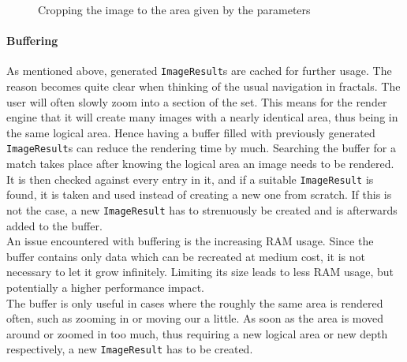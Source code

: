 \documentclass[10pt,a4paper,titlepage]{article}
\begin{document}
	\begin{figure}
		\centering
		\caption{Cropping the image to the area given by the parameters}
		\label{fig:cropping the area}
	\end{figure}
	
	\paragraph{Buffering} \label{par:paragraph_image_creation_buffering}
	As mentioned above, generated \verb|ImageResult|s are cached for further usage. The reason becomes quite clear when thinking of the usual navigation in fractals. The user will often slowly zoom into a section of the set. This means for the render engine that it will create many images with a nearly identical area, thus being in the same logical area. Hence having a buffer filled with previously generated \verb|ImageResult|s can reduce the rendering time by much. Searching the buffer for a match takes place after knowing the logical area an image needs to be rendered. It is then checked against every entry in it, and if a suitable \verb|ImageResult| is found, it is taken and used instead of creating a new one from scratch. If this is not the case, a new \verb|ImageResult| has to strenuously be created and is afterwards added to the buffer.\\
	An issue encountered with buffering is the increasing RAM usage. Since the buffer contains only data which can be recreated at medium cost, it is not necessary to let it grow infinitely. Limiting its size leads to less RAM usage, but potentially a higher performance impact.\\ The buffer is only useful in cases where the roughly the same area is rendered often, such as zooming in or moving our a little. As soon as the area is moved around or zoomed in too much, thus requiring a new logical area or new depth respectively, a new \verb|ImageResult| has to be created.
\end{document}
